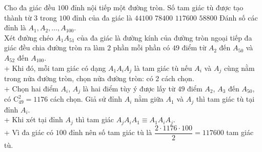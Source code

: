 \begin{ex}%
 Cho đa giác đều $100$ đỉnh nội tiếp một đường tròn. Số tam giác tù được tạo thành từ $3$ trong $100$ đỉnh của đa giác là
 \choice
  {$44100$}
  {$78400$}
  {\True $117600$}
  {$58800$}
 \loigiai
  {
  Đánh số các đỉnh là $A_1,A_2,\ldots,A_{100}$.\\
  Xét đường chéo $A_1A_{51}$ của đa giác là đường kính của đường tròn ngoại tiếp đa giác đều chia đường tròn ra làm $2$ phần mỗi phần có $49$ điểm từ $A_2$ đến $A_{50}$ và $A_{52}$ đến $A_{100}$.\\
  + Khi đó, mỗi tam giác có dạng $A_1A_iA_j$ là tam giác tù nếu $A_i$ và $A_j$ cùng nằm trong nửa đường tròn, chọn nửa đường tròn: có 2 cách chọn.\\
  + Chọn hai điểm $A_i$, $A_j$ là hai điểm tùy ý được lấy từ $49$ điểm $A_2$, $A_3$ đến $A_{50}$, có $\mathrm{C}_{49}^2=1176$ cách chọn. Giả sử đỉnh $A_i$ nằm giữa $A_1$ và $A_j$ thì tam giác tù tại đỉnh $A_i$.\\
  + Khi xét tại đỉnh $A_j$ thì tam giác $A_jA_iA_1\equiv A_1A_iA_j$.\\
  + Vì đa giác có $100$ đỉnh nên số tam giác tù là $\dfrac{2\cdot 1176\cdot 100}{2}=117600$ tam giác tù.
  }
\end{ex}


